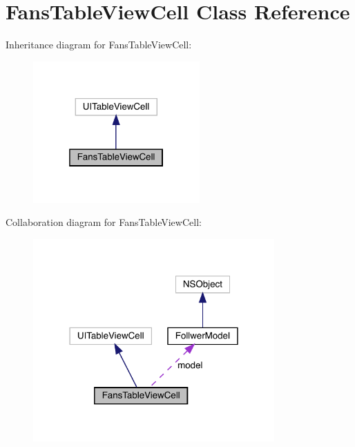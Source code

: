 \hypertarget{interface_fans_table_view_cell}{}\section{Fans\+Table\+View\+Cell Class Reference}
\label{interface_fans_table_view_cell}


Inheritance diagram for Fans\+Table\+View\+Cell\+:\nopagebreak
\begin{figure}[H]
\begin{center}
\leavevmode
\includegraphics[width=181pt]{interface_fans_table_view_cell__inherit__graph}
\end{center}
\end{figure}


Collaboration diagram for Fans\+Table\+View\+Cell\+:\nopagebreak
\begin{figure}[H]
\begin{center}
\leavevmode
\includegraphics[width=262pt]{interface_fans_table_view_cell__coll__graph}
\end{center}
\end{figure}

